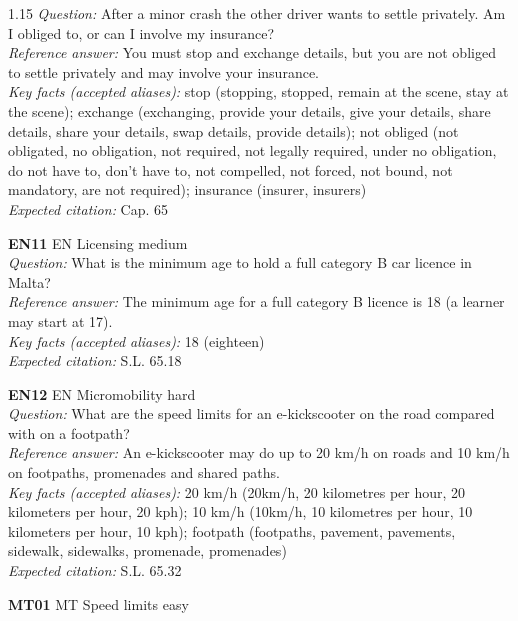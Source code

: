 \begin{spacing}{1.15}
\textit{Question:} After a minor crash the other driver wants to settle privately. Am I obliged to, or can I involve my insurance? \\
\textit{Reference answer:} You must stop and exchange details, but you are not obliged to settle privately and may involve your insurance. \\
\textit{Key facts (accepted aliases):} stop (stopping, stopped, remain at the scene, stay at the scene); exchange (exchanging, provide your details, give your details, share details, share your details, swap details, provide details); not obliged (not obligated, no obligation, not required, not legally required, under no obligation, do not have to, don't have to, not compelled, not forced, not bound, not mandatory, are not required); insurance (insurer, insurers) \\
\textit{Expected citation:} Cap. 65
\par\vspace{5pt}
\noindent\textbf{EN11} \quad EN \quad Licensing \quad medium \\
\textit{Question:} What is the minimum age to hold a full category B car licence in Malta? \\
\textit{Reference answer:} The minimum age for a full category B licence is 18 (a learner may start at 17). \\
\textit{Key facts (accepted aliases):} 18 (eighteen) \\
\textit{Expected citation:} S.L. 65.18
\par\vspace{5pt}
\noindent\textbf{EN12} \quad EN \quad Micromobility \quad hard \\
\textit{Question:} What are the speed limits for an e-kickscooter on the road compared with on a footpath? \\
\textit{Reference answer:} An e-kickscooter may do up to 20 km/h on roads and 10 km/h on footpaths, promenades and shared paths. \\
\textit{Key facts (accepted aliases):} 20 km/h (20km/h, 20 kilometres per hour, 20 kilometers per hour, 20 kph); 10 km/h (10km/h, 10 kilometres per hour, 10 kilometers per hour, 10 kph); footpath (footpaths, pavement, pavements, sidewalk, sidewalks, promenade, promenades) \\
\textit{Expected citation:} S.L. 65.32
\par\vspace{5pt}
\noindent\textbf{MT01} \quad MT \quad Speed limits \quad easy \\

\end{spacing}
